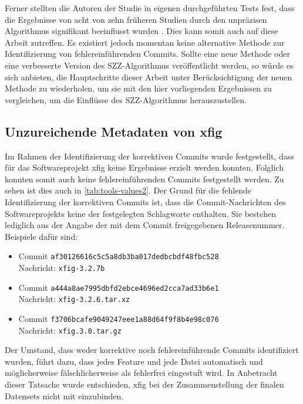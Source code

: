 Ferner stellten die Autoren der Studie in eigenen durchgeführten Tests fest, dass die Ergebnisse von acht von zehn früheren Studien durch den unpräzisen Algorithmus signifikant beeinflusst wurden \cite{Wen2019}. Dies kann somit auch auf diese Arbeit zutreffen. Es existiert jedoch momentan keine alternative Methode zur Identifizierung von fehlereinführenden Commits. Sollte eine neue Methode oder eine verbesserte Version des SZZ-Algorithmus veröffentlicht werden, so würde es sich anbieten, die Hauptschritte dieser Arbeit unter Berücksichtigung der neuen Methode zu wiederholen, um sie mit den hier vorliegenden Ergebnissen zu vergleichen, um die Einflüsse des SZZ-Algorithmus herauszustellen.

\subsection*{Unzureichende Metadaten von xfig}
\label{xfig}
Im Rahmen der Identifizierung der korrektiven Commits wurde festgestellt, dass für das Softwareprojekt xfig keine Ergebnisse erzielt werden konnten. Folglich konnten somit auch keine fehlereinführenden Commits festgestellt werden. Zu sehen ist dies auch in \autoref{tab:tools-values2}. Der Grund für die fehlende Identifizierung der korrektiven Commits ist, dass die Commit-Nachrichten des Softwareprojekts keine der festgelegten Schlagworte enthalten. Sie bestehen lediglich aus der Angabe der mit dem Commit freigegebenen Releasenummer. Beispiele dafür sind:

\begin{itemize}
\setlength{\itemsep}{-2pt}
\item Commit \texttt{af30126616c5c5a8db3ba017dedbcbdf48fbc528}\\Nachricht: \texttt{xfig-3.2.7b}
\item Commit \texttt{a444a8ae7995dbfd2ebce4696ed2cca7ad33b6e1}\\Nachricht: \texttt{xfig-3.2.6.tar.xz}
\item Commit \texttt{f3706bcafe9049247eee1a88d64f9f8b4e98c076}\\Nachricht: \texttt{xfig.3.0.tar.gz}
\end{itemize}

Der Umstand, dass weder korrektive noch fehlereinführende Commits identifiziert wurden, führt dazu, dass jedes Feature und jede Datei automatisch und möglicherweise fälschlicherweise als \glqq fehlerfrei\grqq{} eingestuft wird. In Anbetracht dieser Tatsache wurde entschieden, xfig bei der Zusammenstellung der finalen Datensets nicht mit einzubinden.

